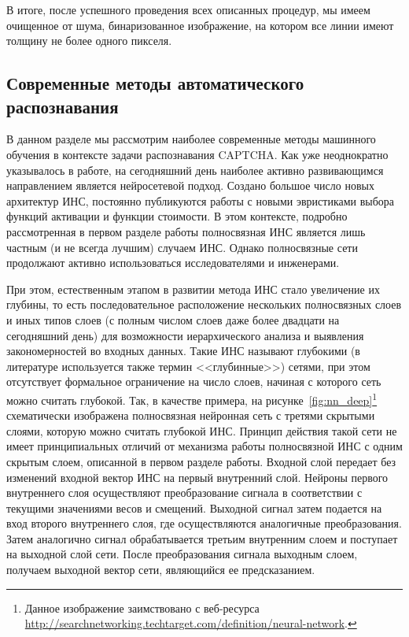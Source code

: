 \documentclass[a4paper,12pt,russian]{article} %
\begin{document}
В итоге, после успешного проведения всех описанных процедур, мы имеем очищенное от шума, бинаризованное изображение, на котором все линии имеют толщину не более одного пикселя.

\newpage
\subsection{Современные методы автоматического распознавания} \label{ss:captheory_methods}

В данном разделе мы рассмотрим наиболее современные методы машинного обучения в контексте задачи распознавания CAPTCHA.
Как уже неоднократно указывалось в работе, на сегодняшний день наиболее активно развивающимся направлением является нейросетевой подход.
Создано большое число новых архитектур ИНС, постоянно публикуются работы с новыми эвристиками выбора функций активации и функции стоимости.
В этом контексте, подробно рассмотренная в первом разделе работы полносвязная ИНС является лишь частным (и не всегда лучшим) случаем ИНС.
Однако полносвязные сети продолжают активно использоваться исследователями и инженерами.

При этом, естественным этапом в развитии метода ИНС стало увеличение их глубины, то есть последовательное расположение нескольких полносвязных слоев и иных типов слоев (с полным числом слоев даже более двадцати на сегодняшний день) для возможности иерархического анализа и выявления закономерностей во входных данных.
Такие ИНС называют глубокими (в литературе используется также термин <<глубинные>>) сетями, при этом отсутствует формальное ограничение на число слоев, начиная с которого сеть можно считать глубокой.
Так, в  качестве примера, на рисунке~\ref{fig:nn_deep}\footnote{
	Данное изображение заимствовано с веб-ресурса \url{http://searchnetworking.techtarget.com/definition/neural-network}.
}
схематически изображена полносвязная нейронная сеть с третями скрытыми слоями, которую можно считать глубокой ИНС.
Принцип действия такой сети не имеет принципиальных отличий от механизма работы полносвязной ИНС с одним скрытым слоем, описанной в первом разделе работы.
Входной слой передает без изменений входной вектор ИНС на первый внутренний слой.
Нейроны первого внутреннего слоя осуществляют преобразование сигнала в соответствии с текущими значениями весов и смещений.
Выходной сигнал затем подается на вход второго внутреннего слоя, где осуществляются аналогичные преобразования.
Затем аналогично сигнал обрабатывается третьим внутренним слоем и поступает на выходной слой сети.
После преобразования сигнала выходным слоем, получаем выходной вектор сети, являющийся ее предсказанием.
\end{document}
